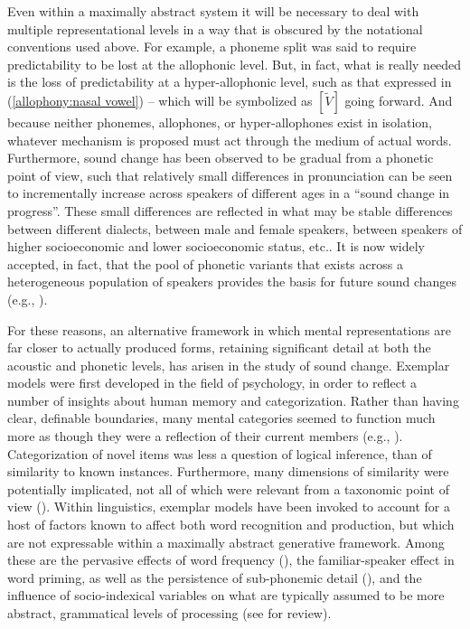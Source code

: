 Even within a maximally abstract system it will be necessary to deal
with multiple representational levels in a way that is obscured by
the notational conventions used above. For example, a phoneme split
was said to require predictability to be lost at the allophonic level.
But, in fact, what is really needed is the loss of predictability
at a hyper-allophonic level, such as that expressed in (\ref{allophony:nasal vowel})
– which will be symbolized as $[\tilde{V}]$ going forward. And because
neither phonemes, allophones, or hyper-allophones exist in isolation,
whatever mechanism is proposed must act through the medium of actual
words. Furthermore, sound change has been observed to be gradual from
a phonetic point of view, such that relatively small differences in
pronunciation can be seen to incrementally increase across speakers
of different ages in a “sound change in progress”. These small
differences are reflected in what may be stable differences between
different dialects, between male and female speakers, between speakers
of higher socioeconomic and lower socioeconomic status, etc.. It is
now widely accepted, in fact, that the pool of phonetic variants that
exists across a heterogeneous population of speakers provides the
basis for future sound changes (e.g., \citealt{Guy2008}).

For these reasons, an alternative framework in which mental representations
are far closer to actually produced forms, retaining significant detail
at both the acoustic and phonetic levels, has arisen in the study
of sound change. Exemplar models were first developed in the field
of psychology, in order to reflect a number of insights about human
memory and categorization. Rather than having clear, definable boundaries,
many mental categories seemed to function much more as though they
were a reflection of their current members (e.g., \citet{Rosch1977}).
Categorization of novel items was less a question of logical inference,
than of similarity to known instances. Furthermore, many dimensions
of similarity were potentially implicated, not all of which were relevant
from a taxonomic point of view (\citealt{Nosofsky1988,Luce1986}).
Within linguistics, exemplar models have been invoked to account for
a host of factors known to affect both word recognition and production,
but which are not expressable within a maximally abstract generative
framework. Among these are the pervasive effects of word frequency
(\citealt{Bybee2001}), the familiar-speaker effect in word priming,
as well as the persistence of sub-phonemic detail (\citealt{tilsen2009subphonemic}),
and the influence of socio-indexical variables on what are typically
assumed to be more abstract, grammatical levels of processing (see
\citealt{docherty2014evaluation} for review). 

